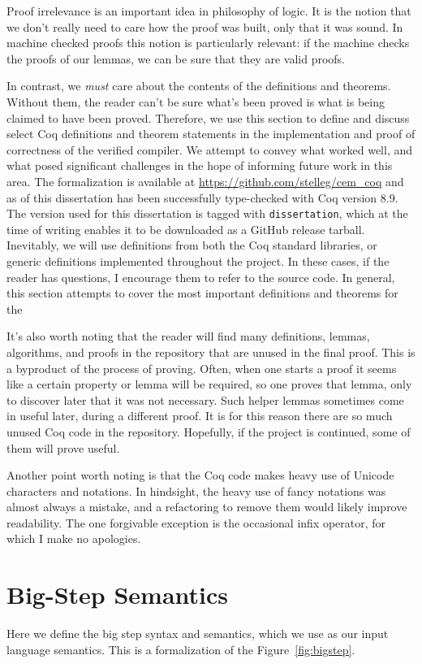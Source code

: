 
Proof irrelevance is an important idea in philosophy of logic. It is the notion
that we don't really need to care how the proof was built, only that it was
sound. In machine checked proofs this notion is particularly relevant: if the
machine checks the proofs of our lemmas, we can be sure that they are valid
proofs.

In contrast, we \emph{must} care about the contents of the definitions and
theorems. Without them, the reader can't be sure what's been proved is what is
being claimed to have been proved. Therefore, we use this section to define and
discuss select Coq definitions and theorem statements in the implementation and
proof of correctness of the verified compiler. We attempt to convey what worked
well, and what posed significant challenges in the hope of informing future work
in this area. The formalization is available at
\url{https://github.com/stelleg/cem\_coq} and as of this dissertation has been
successfully type-checked with Coq version 8.9.  The version used for this
dissertation is tagged with \texttt{dissertation}, which at the time of writing
enables it to be downloaded as a GitHub release tarball. Inevitably, we will use
definitions from both the Coq standard libraries, or generic definitions
implemented throughout the project. In these cases, if the reader has questions,
I encourage them to refer to the source code. In general, this section attempts
to cover the most important definitions and theorems for the 

It's also worth noting that the reader will find many definitions, lemmas,
algorithms, and proofs in the repository that are unused in the final proof.
This is a byproduct of the process of proving. Often, when one starts a proof it
seems like a certain property or lemma will be required, so one proves that
lemma, only to discover later that it was not necessary. Such helper lemmas
sometimes come in useful later, during a different proof. It is for this reason
there are so much unused Coq code in the repository. Hopefully, if the project
is continued, some of them will prove useful.

Another point worth noting is that the Coq code makes heavy use of Unicode
characters and notations. In hindsight, the heavy use of fancy notations was
almost always a mistake, and a refactoring to remove them would likely improve
readability. The one forgivable exception is the occasional infix operator, for
which I make no apologies.

\section{Big-Step \ce Semantics}
Here we define the big step syntax and semantics, which we use as our input
language semantics. This is a formalization of the Figure~\ref{fig:bigstep}.

